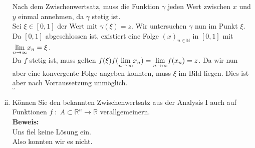 \begin{enumerate}[(i)]
		Nach dem Zwischenwertsatz, muss die Funktion $\gamma$ jeden Wert zwischen $x$ und $y$ einmal annehmen, da
		$\gamma$ stetig ist.\\

		Sei $\xi \in [0,1]$ der Wert mit $\gamma (\xi) = z$. Wir untersuchen $\gamma$ nun im Punkt $\xi$.\\

		Da $[0,1]$ abgeschlossen ist, existiert eine Folge $(x)_{n \in \mathbb{N}}$ in $[0,1]$ mit $\underset{ n \rightarrow \infty}{\lim} x_n = \xi$.\\

		Da $f$ stetig ist, muss gelten $f(\xi) f( \underset{ n \rightarrow \infty}{\lim} x_n ) = \underset{ n \rightarrow \infty}{\lim} f(x_n) = z$. Da wir nun aber eine
		konvergente Folge angeben konnten, muss $\xi$ im Bild liegen. Dies ist aber nach Vorraussetzung unmöglich.\\

		\mbox{} \hfill $\square$ 

    \item Können Sie den bekannten Zwischenwertsatz aus der Analysis I auch auf Funktionen
        $f \; : \; A \subset \mathbb{R}^n \rightarrow \mathbb{R}$ verallgemeinern.\\
    \textbf{Beweis:}\\
       	Uns fiel keine Lösung ein.\\
	Also konnten wir es nicht.
\end{enumerate}
